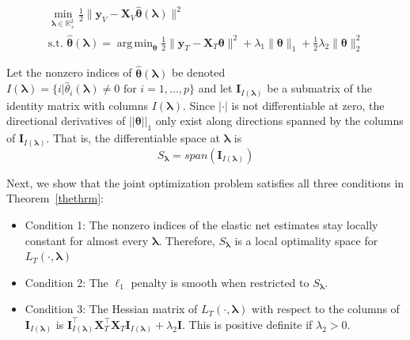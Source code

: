 \documentclass[12pt,letterpaper]{article}
\DeclareMathOperator*{\argmin}{arg\,min}
\begin{document}
\begin{equation}
\begin{array}{c}
\min_{\boldsymbol{\lambda} \in \mathbb{R}^2_{+}} \frac{1}{2} \| \boldsymbol{y}_V - \boldsymbol{X}_V \hat{\boldsymbol{\theta}} (\boldsymbol \lambda) \| ^2 \\
\text{s.t. }
\hat{\boldsymbol{\theta}} (\boldsymbol{\lambda}) = \argmin_{\boldsymbol{\theta}} \frac{1}{2} \| \boldsymbol{y}_T - \boldsymbol{X}_T \boldsymbol{\theta} \| ^2
+ \lambda_1 \| \boldsymbol{\theta} \|_1
+ \frac{1}{2}\lambda_2 \| \boldsymbol{\theta} \|_2^2
\end{array}
\end{equation}

Let the nonzero indices of $\hat{\boldsymbol{\theta}}(\boldsymbol{\lambda})$ be denoted $I(\boldsymbol\lambda) = \{i | \hat{\theta}_i(\boldsymbol\lambda) \ne 0 \text{ for } i=1,...,p \}$ and let $\boldsymbol I_{I(\boldsymbol \lambda)}$ be a submatrix of the identity matrix with columns $I(\boldsymbol\lambda)$. Since $|\cdot|$ is not differentiable at zero, the directional derivatives of $||\boldsymbol \theta||_1$ only exist along directions spanned by the columns of $\boldsymbol I_{I(\boldsymbol \lambda)}$. That is, the differentiable space at $\boldsymbol \lambda$ is
\begin{equation}
S_{\boldsymbol{\lambda}} = span(\boldsymbol I_{I(\boldsymbol \lambda)})
\end{equation}

Next, we show that the joint optimization problem satisfies all three conditions in Theorem~\ref{thethrm}:
\begin{itemize}
\item[] Condition 1: The nonzero indices of the elastic net estimates stay locally constant for almost every $\boldsymbol{\lambda}$. Therefore, $S_{\boldsymbol{\lambda}}$ is a local optimality space for $L_T(\cdot, \boldsymbol{\lambda})$ \hfill {}
\item[] Condition 2: The $\ell_1$ penalty is smooth when restricted to $S_{\boldsymbol{\lambda}}$.\hfill {}
\item[] Condition 3: The Hessian matrix of $L_T(\cdot, \boldsymbol{\lambda})$ with respect to the columns of $\boldsymbol I_{I(\boldsymbol \lambda)}$ is $\boldsymbol I_{I(\boldsymbol \lambda)}^\top \boldsymbol{X}_{T}^\top \boldsymbol{X}_{T} \boldsymbol I_{I(\boldsymbol \lambda)} + \lambda_2 \boldsymbol{I}$. This is positive definite if $\lambda_2 > 0$. \hfill {}
\end{itemize}
\end{document}
